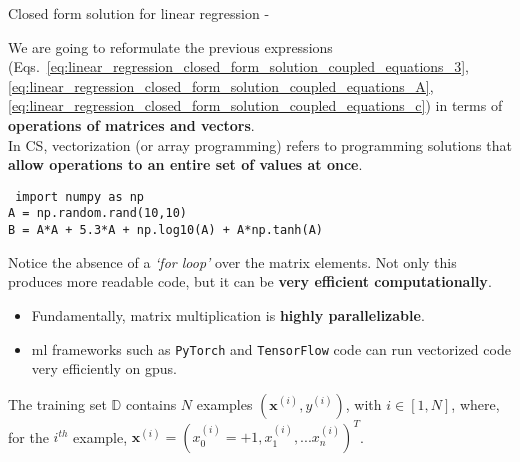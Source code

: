 \begin{frame}[t,allowframebreaks]{Closed form solution for linear regression -}
    \framebreak

    We are going to reformulate the previous expressions
    (Eqs.~\ref{eq:linear_regression_closed_form_solution_coupled_equations_3},
    \ref{eq:linear_regression_closed_form_solution_coupled_equations_A},
    \ref{eq:linear_regression_closed_form_solution_coupled_equations_c}) 
    in terms of {\bf operations of matrices and vectors}.\\
    \vspace{0.2cm}
    In CS, \gls{vectorization}
    (or \gls{array programming}) 
    refers to programming solutions that 
    {\bf allow operations to an entire set of values at once}.\\

    \begin{blockexample}{}
        \small \tt
        import numpy as np\\
        \vspace{0.4cm}
        A = np.random.rand(10,10)\\
        B = A*A + 5.3*A + np.log10(A) + A*np.tanh(A)\\
    \end{blockexample}  

    Notice the absence of a {\em `for loop'} over the matrix elements.
    Not only this produces more readable code, 
    but it can be {\bf very efficient computationally}.
    \begin{itemize}
        \item Fundamentally, matrix multiplication is {\bf highly parallelizable}. 
        \item \gls{ml} frameworks such as {\tt PyTorch} and {\tt TensorFlow} 
              code can run vectorized code very efficiently on \glspl{gpu}.
    \end{itemize}

    \framebreak

    The training set $\mathbb{D}$ contains $N$ examples 
    $(\mathbf{x}^{(i)},y^{(i)})$, with $i \in [1,N]$,
    where, for the $i^{th}$ example, 
    $\mathbf{x}^{(i)}=(x_0^{(i)}=+1, x_1^{(i)},...x_{n}^{(i)})^T$.\\
    \vspace{0.2cm}
        

\end{frame}
